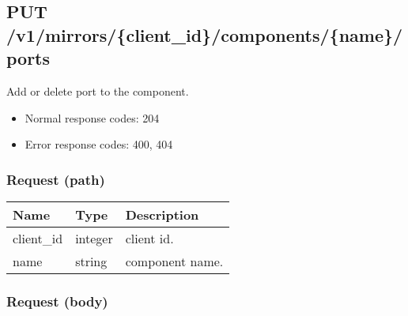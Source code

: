 \documentclass[a4paper,11pt,openany,oneside,english]{sphinxmanual}
\begin{document}
\subsection{PUT /v1/mirrors/\{client\_id\}/components/\{name\}/ports}
\label{\detokenize{api_ref/spp_mirror:put-v1-mirrors-client-id-components-name-ports}}
Add or delete port to the component.
\begin{itemize}
\item {} 
Normal response codes: 204

\item {} 
Error response codes: 400, 404

\end{itemize}


\subsubsection{Request (path)}
\label{\detokenize{api_ref/spp_mirror:id9}}

\begin{savenotes}\sphinxattablestart
\centering
{}
\sphinxthecaptionisattop
{}\label{\detokenize{api_ref/spp_mirror:id21}}\label{\detokenize{api_ref/spp_mirror:table-spp-ctl-spp-mirror-comp-port}}
\sphinxaftertopcaption
\begin{tabulary}{\linewidth}[t]{|T|T|T|}
\hline
\sphinxstyletheadfamily 
Name
&\sphinxstyletheadfamily 
Type
&\sphinxstyletheadfamily 
Description
\\
\hline
client\_id
&
integer
&
client id.
\\
\hline
name
&
string
&
component name.
\\
\hline
\end{tabulary}
\par
\sphinxattableend\end{savenotes}


\subsubsection{Request (body)}
\label{\detokenize{api_ref/spp_mirror:id10}}
\end{document}
